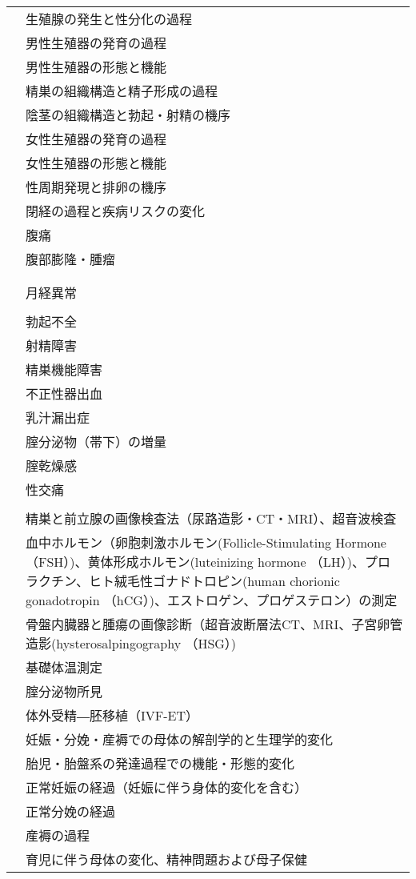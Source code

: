 \begin{xltabular}{\linewidth}{XX}
 & 生殖腺の発生と性分化の過程 \\
 & 男性生殖器の発育の過程 \\
 & 男性生殖器の形態と機能 \\
 & 精巣の組織構造と精子形成の過程 \\
 & 陰茎の組織構造と勃起・射精の機序 \\
 & 女性生殖器の発育の過程 \\
 & 女性生殖器の形態と機能 \\
 & 性周期発現と排卵の機序 \\
 & 閉経の過程と疾病リスクの変化 \\
 & 腹痛 \\
 & 腹部膨隆・腫瘤 \\
 &  \\
 &  \\
 & 月経異常 \\
 &  \\
 & 勃起不全 \\
 & 射精障害 \\
 & 精巣機能障害 \\
 & 不正性器出血 \\
 & 乳汁漏出症 \\
 & 腟分泌物（帯下）の増量 \\
 & 腟乾燥感 \\
 & 性交痛 \\
 &  \\
 & 精巣と前立腺の画像検査法（尿路造影・CT・MRI）、超音波検査 \\
 & 血中ホルモン（卵胞刺激ホルモン(Follicle-Stimulating Hormone （FSH）)、黄体形成ホルモン(luteinizing hormone （LH）)、プロラクチン、ヒト絨毛性ゴナドトロピン(human chorionic gonadotropin （hCG）)、エストロゲン、プロゲステロン）の測定 \\
 & 骨盤内臓器と腫瘍の画像診断（超音波断層法CT、MRI、子宮卵管造影(hysterosalpingography （HSG）) \\
 & 基礎体温測定 \\
 & 腟分泌物所見 \\
 & 体外受精―胚移植（IVF-ET） \\
 & 妊娠・分娩・産褥での母体の解剖学的と生理学的変化 \\
 & 胎児・胎盤系の発達過程での機能・形態的変化 \\
 & 正常妊娠の経過（妊娠に伴う身体的変化を含む） \\
 & 正常分娩の経過 \\
 & 産褥の過程 \\
 & 育児に伴う母体の変化、精神問題および母子保健 \\

\end{xltabular}
